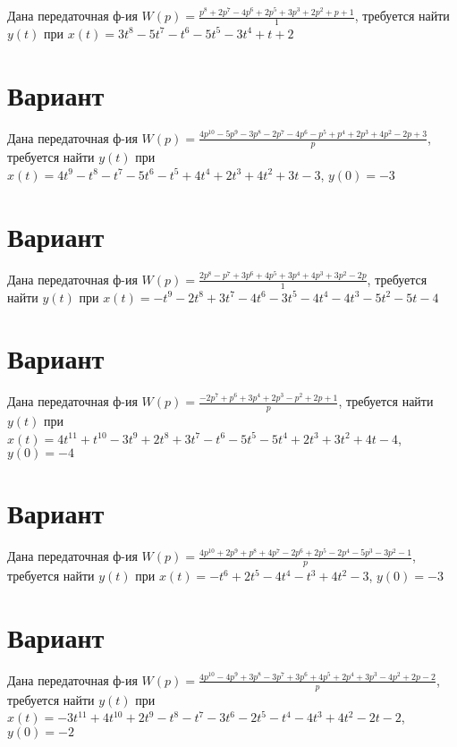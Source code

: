 \documentclass{article}
\begin{document}
Дана передаточная ф-ия $W(p)=\frac{p^{8}+2p^{7}-4p^{6}+2p^{5}+3p^{3}+2p^{2}+p+1}{1}$, требуется найти $y(t)$ при $x(t)=3t^{8}-5t^{7}-t^{6}-5t^{5}-3t^{4}+t+2$



\section{Вариант}

Дана передаточная ф-ия $W(p)=\frac{4p^{10}-5p^{9}-3p^{8}-2p^{7}-4p^{6}-p^{5}+p^{4}+2p^{3}+4p^{2}-2p+3}{p}$, требуется найти $y(t)$ при $x(t)=4t^{9}-t^{8}-t^{7}-5t^{6}-t^{5}+4t^{4}+2t^{3}+4t^{2}+3t-3$, $y(0)=-3$



\section{Вариант}

Дана передаточная ф-ия $W(p)=\frac{2p^{8}-p^{7}+3p^{6}+4p^{5}+3p^{4}+4p^{3}+3p^{2}-2p}{1}$, требуется найти $y(t)$ при $x(t)=-t^{9}-2t^{8}+3t^{7}-4t^{6}-3t^{5}-4t^{4}-4t^{3}-5t^{2}-5t-4$



\section{Вариант}

Дана передаточная ф-ия $W(p)=\frac{-2p^{7}+p^{6}+3p^{4}+2p^{3}-p^{2}+2p+1}{p}$, требуется найти $y(t)$ при $x(t)=4t^{11}+t^{10}-3t^{9}+2t^{8}+3t^{7}-t^{6}-5t^{5}-5t^{4}+2t^{3}+3t^{2}+4t-4$, $y(0)=-4$



\section{Вариант}

Дана передаточная ф-ия $W(p)=\frac{4p^{10}+2p^{9}+p^{8}+4p^{7}-2p^{6}+2p^{5}-2p^{4}-5p^{3}-3p^{2}-1}{p}$, требуется найти $y(t)$ при $x(t)=-t^{6}+2t^{5}-4t^{4}-t^{3}+4t^{2}-3$, $y(0)=-3$



\section{Вариант}

Дана передаточная ф-ия $W(p)=\frac{4p^{10}-4p^{9}+3p^{8}-3p^{7}+3p^{6}+4p^{5}+2p^{4}+3p^{3}-4p^{2}+2p-2}{p}$, требуется найти $y(t)$ при $x(t)=-3t^{11}+4t^{10}+2t^{9}-t^{8}-t^{7}-3t^{6}-2t^{5}-t^{4}-4t^{3}+4t^{2}-2t-2$, $y(0)=-2$
\end{document}

